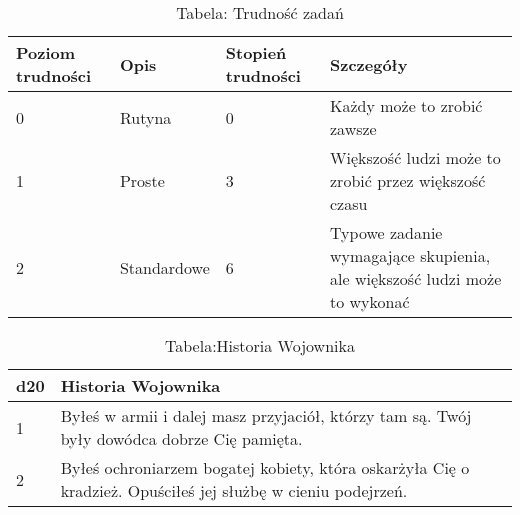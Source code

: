 
\begin{table*}[t]
 \centering
 \begin{tabularx}{\textwidth}{ | X | X | X | X |}
  \hline
   Poziom trudności & Opis & Stopień trudności & Szczegóły  \\ \hline
    0 & Rutyna & 0 & Każdy może to zrobić zawsze \\ \hline
    1 & Proste & 3 & Większość ludzi może to zrobić przez większość czasu  \\ \hline
    2 & Standardowe & 6 & Typowe zadanie wymagające skupienia, ale większość ludzi może to wykonać \\ \hline
 \end{tabularx}
  \caption {Tabela: Trudność zadań}
  \label {Tabela: Trudność zadań}
 \end{table*}
 
 
 \begin{table*}[t]
 \centering
 \begin{tabularx}{\textwidth}{| p{} | X |}
  \hline
  d20 & Historia Wojownika  \\ \hline
    1 & Byłeś w armii i dalej masz przyjaciół, którzy tam są. Twój były dowódca dobrze Cię pamięta. \\ \hline
    2 & Byłeś ochroniarzem bogatej kobiety, która oskarżyła Cię o kradzież. Opuściłeś jej służbę w cieniu podejrzeń. \\ \hline
 \end{tabularx}
  \caption {Tabela:Historia Wojownika}
  \label {Tabela: Historia Wojownika}
 \end{table*}
